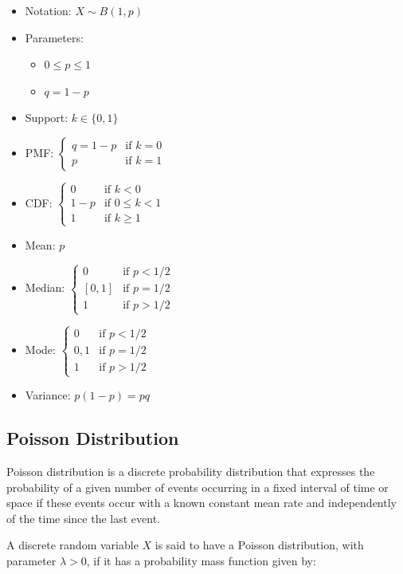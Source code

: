 \documentclass{article}
\begin{document}
\begin{itemize}
    \item Notation: $X \sim B(1,p)$
    \item Parameters: 
        \begin{itemize}
            \item $ 0 \leq p \leq 1 $
            \item $ q=1 - p $
        \end{itemize}
    \item Support: $ k\in \{0,1\} $
    \item PMF: $ \displaystyle {\begin{cases}q=1-p&{\text{if }}k=0\\p&{\text{if }}k=1\end{cases}} $
    \item CDF: $ \displaystyle {\begin{cases}0&{\text{if }}k<0\\1-p&{\text{if }}0\leq k<1\\1&{\text{if }}k\geq 1\end{cases}} $
    \item Mean: $p$
    \item Median: $ \displaystyle {\begin{cases}0&{\text{if }}p<1/2\\\left[0,1\right]&{\text{if }}p=1/2\\1&{\text{if }}p>1/2\end{cases}} $
    \item Mode: $ \displaystyle {\begin{cases}0&{\text{if }}p<1/2\\0,1&{\text{if }}p=1/2\\1&{\text{if }}p>1/2\end{cases}} $
    \item Variance: $ \displaystyle p(1-p)=pq $ 
\end{itemize}

\subsection{Poisson Distribution}
Poisson distribution is a discrete probability distribution that expresses the probability of a given number of events occurring in a fixed interval of time or space if these events occur with a known constant mean rate and independently of the time since the last event.

A discrete random variable $X$ is said to have a Poisson distribution, with parameter $\lambda > 0$, if it has a probability mass function given by:
\end{document}
